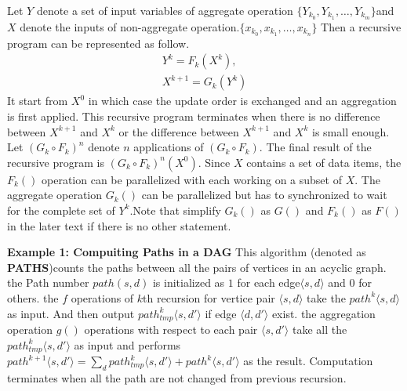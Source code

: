 Let $Y$ denote a set of input variables of aggregate operation $\{Y_{k_0},Y_{k_1},\dots,Y_{k_m}\}$and $X$ denote the inputs of non-aggregate  operation.$\{x_{k_0},x_{k_1},\dots,x_{k_n}\}$%
Then a recursive program can be represented as follow.
\begin{equation}
\label{eq:recursive2}
\begin{aligned}
Y^{k}=F_k(X^k),\\
X^{k+1}=G_k(Y^k)
\end{aligned}
\end{equation}
It  start from $X^0$ in which case the update order is exchanged and an aggregation is first applied. This recursive program terminates when there is no difference between $X^{k+1}$ and $X^k$ or the difference between $X^{k+1}$ and $X^k$ is small enough. Let $(G_k\circ F_k)^n$ denote $n$ applications of $(G_k\circ F_k)$. The final result of the recursive program is $(G_k\circ F_k)^n(X^0)$. Since $X$ contains a set of data items, the $F_k()$ operation can be parallelized with each working on a subset of $X$. The aggregate operation $G_k()$ can be parallelized  but has to synchronized to wait for the complete set of $Y^{k}$.Note that simplify $G_k()$ as $G()$ and $F_k()$ as $F()$ in the later text if there is no other statement.

\textbf{Example 1: Compuiting Paths in a DAG} This algorithm (denoted as \textbf{PATHS})counts the paths between all the pairs of vertices in an acyclic graph. the Path number $path(s,d)$ is initialized as $1$ for each edge$\langle s,d\rangle$ and $0$ for others. the $f$ operations of $k$th recursion for vertice pair $\langle s,d\rangle$ take the $path^k\langle s,d\rangle$ as input. And then output $path_{tmp}^k\langle s,d'\rangle$ if edge $\langle d,d'\rangle$ exist. the aggregation operation $g()$ operations with respect to each pair $\langle s,d'\rangle$ take all the $path_{tmp}^k\langle s,d'\rangle$ as input and performs $path^{k+1}\langle s,d'\rangle=\sum_d path_{tmp}^k\langle s,d'\rangle+path^k\langle s,d'\rangle$ as the result. Computation terminates when all the path are not changed from previous recursion.


